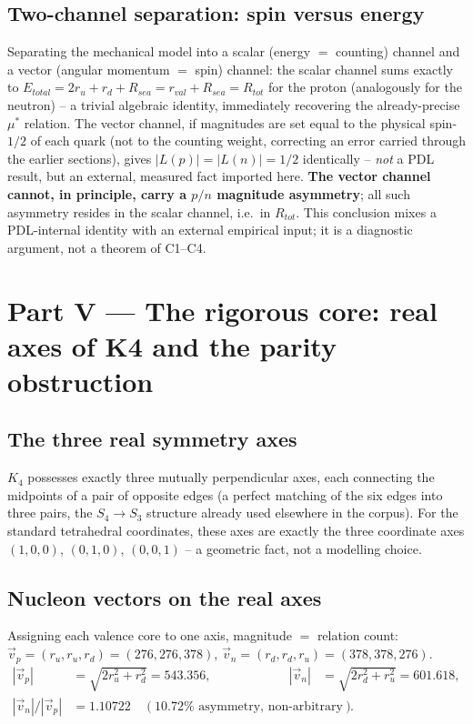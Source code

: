 \documentclass[11pt]{article}
\def\texorpdfstring#1#2{#2}%
\begin{document}
\subsection{Two-channel separation: spin versus energy}
\begin{resultbox}
Separating the mechanical model into a scalar (energy $=$ counting) channel and a vector (angular momentum $=$ spin) channel: the scalar channel sums exactly to $E_{total}=2r_u+r_d+R_{sea}=r_{val}+R_{sea}=R_{tot}$ for the proton (analogously for the neutron) -- a trivial algebraic identity, immediately recovering the already-precise $\mu^*$ relation. The vector channel, if magnitudes are set equal to the physical spin-$1/2$ of each quark (not to the counting weight, correcting an error carried through the earlier sections), gives $|L(p)|=|L(n)|=1/2$ identically -- \emph{not} a PDL result, but an external, measured fact imported here. \textbf{The vector channel cannot, in principle, carry a $p/n$ magnitude asymmetry}; all such asymmetry resides in the scalar channel, i.e.\ in $R_{tot}$. This conclusion mixes a PDL-internal identity with an external empirical input; it is a diagnostic argument, not a theorem of C1--C4.
\end{resultbox}

\section{Part V --- The rigorous core: real axes of \texorpdfstring{$K_4$}{K4} and the parity obstruction}
\label{sec:axes}

\subsection{The three real symmetry axes}
\label{sec:realaxes}
$K_4$ possesses exactly three mutually perpendicular axes, each connecting the midpoints of a pair of opposite edges (a perfect matching of the six edges into three pairs, the $S_4\to S_3$ structure already used elsewhere in the corpus). For the standard tetrahedral coordinates, these axes are exactly the three coordinate axes $(1,0,0)$, $(0,1,0)$, $(0,0,1)$ -- a geometric fact, not a modelling choice.

\subsection{Nucleon vectors on the real axes}
Assigning each valence core to one axis, magnitude $=$ relation count: $\vec v_p=(r_u,r_u,r_d)=(276,276,378)$, $\vec v_n=(r_d,r_d,r_u)=(378,378,276)$.
\begin{align}
|\vec v_p| &= \sqrt{2r_u^2+r_d^2} = 543.356, & |\vec v_n| &= \sqrt{2r_d^2+r_u^2} = 601.618,\\
|\vec v_n|/|\vec v_p| &= 1.10722 \quad (10.72\%\text{ asymmetry, non-arbitrary}).
\end{align}
\end{document}
